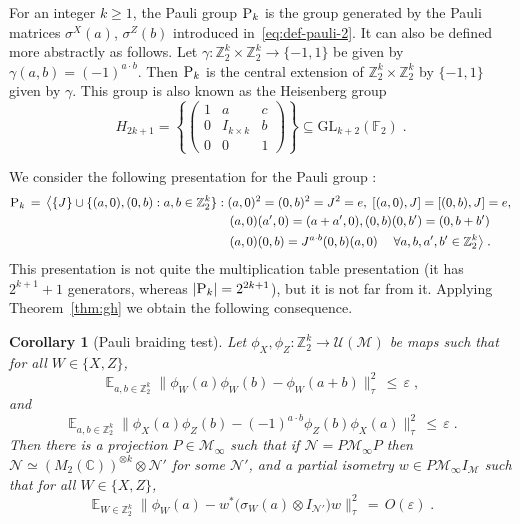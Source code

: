 \documentclass[11pt]{article}
\newtheorem{corollary}[theorem]{Corollary}
\theoremstyle{definition}
\newcommand{\Id}{\ensuremath{I}}
\DeclareMathOperator*{\Expectation}{\mathbb{E}}
\newcommand{\Es}[1]{\Expectation_{#1}}
\newcommand{\C}{\ensuremath{\mathbb{C}}}
\newcommand{\F}{\ensuremath{\mathbb{F}}}
\newcommand{\Z}{\ensuremath{\mathbb{Z}}}
\newcommand{\mM}{\ensuremath{\mathcal{M}}}
\newcommand{\mU}{\ensuremath{\mathcal{U}}}
\newcommand{\eps}{\varepsilon}
\newcommand{\mN}{\mathcal{N}}
\newcommand{\gamestyle}[1]{\ensuremath{\textsc{#1}}\xspace}
\newcommand{\pauli}{\gamestyle{P}}
\begin{document}
For an integer $k\geq 1$,  the Pauli group $\pauli_k$ is the group generated by the Pauli matrices $\sigma^X(a)$, $\sigma^Z(b)$ introduced in~\eqref{eq:def-pauli-2}. It can also be defined more abstractly as follows. Let $\gamma: \Z_2^k\times \Z_2^k \to \{-1,1\}$ be given by $\gamma(a,b)=(-1)^{a\cdot b}$. Then $\pauli_k$ is the central extension of $\Z_2^k\times \Z_2^k$ by $\{-1,1\}$ given by $\gamma$. This group 
is also known as the Heisenberg group 
\begin{equation}\label{eq:defn_Pauli_as_Heisenberg} H_{2k+1} = \left \{ \begin{pmatrix} 1 & a & c \\ 0 & I_{k \times k} & b \\ 0 & 0 & 1 \end{pmatrix} \right\}\subseteq {\mathrm{GL}}_{k+2}(\F_2)\;.
\end{equation}
 
We consider the following presentation for the Pauli group :
\begin{align}
 \pauli_k \,=\, \big\langle \{J\}\cup  \{(a,0),(0,b): a,b\in \Z_2^k\} &: (a,0)^2=(0,b)^2=J^2=e,\; [(a,0),J]=[(0,b),J]=e,\notag\\
 &\quad(a,0)(a',0)=(a+a',0),(0,b)(0,b')=(0,b+b') \notag\\
&\quad  (a,0)(0,b) = J^{a\cdot b} (0,b)(a,0) \; \quad \forall a,b,a',b'\in \Z_2^k\big\rangle\;.\label{eq:almost_mult_table_pres_of_Pauli}
\end{align}
This presentation is not quite the multiplication table presentation (it has $2^{k+1}+1$ generators, whereas $|\pauli_k|=2^{2k+1}$), but it is not far from it.  
Applying Theorem~\ref{thm:gh} we obtain the following consequence.%

\begin{corollary}[Pauli braiding test]\label{cor:Pauli-brading_is_stable}
Let $\phi_X,\phi_Z:\Z_2^k \to \mU(\mM)$ be maps such that for all $W\in \{X,Z\}$,
\[ \Es{a,b\in \Z_2^k} \big\| \phi_W(a)\phi_W(b)-\phi_W(a+b) \big\|_\tau^2 \,\leq\,\eps\;,\]
and
\[ \Es{a,b\in \Z_2^k} \big\| \phi_X(a)\phi_Z(b)- (-1)^{a\cdot b} \phi_Z(b)\phi_X(a) \big\|_{\tau}^2 \,\leq\,\eps\;.\]
Then there is a projection $P\in \mM_\infty$ such that if $\mN=P\mM_\infty P$ then $\mN\simeq (M_2(\C))^{\otimes k} \otimes \mN'$ for some $\mN'$, and a
partial isometry $w\in P\mM_\infty I_\mM$ such that for all $W\in \{X,Z\}$, 
\[ \Es{W\in \Z_2^k} \big\| \phi_W(a) - w^* \big(\sigma_W(a)\otimes \Id_{\mN'}\big) w \big\|_{\tau}^2 \,=\, O(\eps)\;.\]
\end{corollary}
\end{document}
